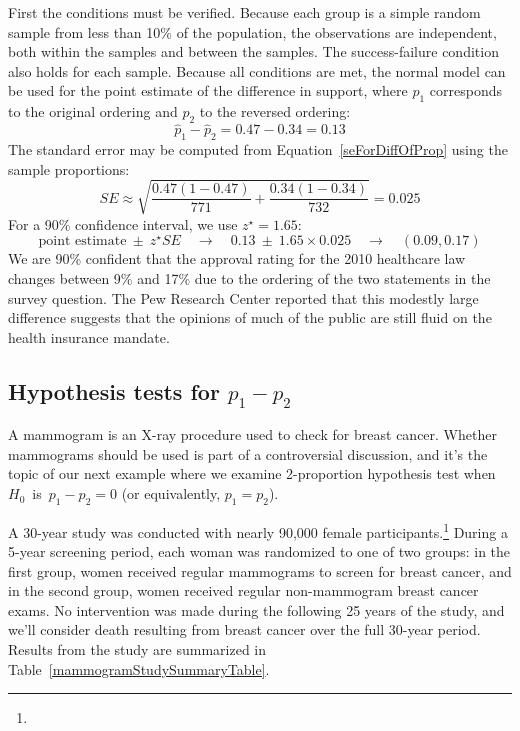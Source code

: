 \begin{example}
First the conditions must be verified. Because each group is a simple random sample from less than 10\% of the population, the observations are independent, both within the samples and between the samples. The success-failure condition also holds for each sample. Because all conditions are met, the normal model can be used for the point estimate of the difference in support, where $p_1$ corresponds to the original ordering and $p_2$ to the reversed ordering:
$$\hat{p}_{1} - \hat{p}_{2} = 0.47 - 0.34 = 0.13$$
The standard error may be computed from Equation~\eqref{seForDiffOfProp} using the sample proportions:
$$SE \approx \sqrt{\frac{0.47(1-0.47)}{771} + \frac{0.34(1-0.34)}{732}} = 0.025$$
For a 90\% confidence interval, we use $z^{\star} = 1.65$:
$$\text{point estimate} \ \pm\ z^{\star}SE \quad \to \quad 0.13 \ \pm\ 1.65 \times  0.025 \quad \to \quad (0.09, 0.17)$$
We are 90\% confident that the approval rating for the 2010 healthcare law changes between 9\% and 17\% due to the ordering of the two statements in the survey question. The Pew Research Center reported that this modestly large difference suggests that the opinions of much of the public are still fluid on the health insurance mandate.
\end{example}


\subsection{Hypothesis tests for $p_1 -p_2$}


A mammogram is an X-ray procedure used to check for breast cancer. Whether mammograms should be used is part of a controversial discussion, and it's the topic of our next example where we examine 2-proportion hypothesis test when $H_0$~is~$p_1 - p_2 = 0$ (or equivalently, $p_1 = p_2$).

A 30-year study was conducted with nearly 90,000 female participants.\footnote{} During a 5-year screening period, each woman was randomized to one of two groups: in the first group, women received regular mammograms to screen for breast cancer, and in the second group, women received regular non-mammogram breast cancer exams. No intervention was made during the following 25 years of the study, and we'll consider death resulting from breast cancer over the full 30-year period. Results from the study are summarized in Table~\ref{mammogramStudySummaryTable}.


